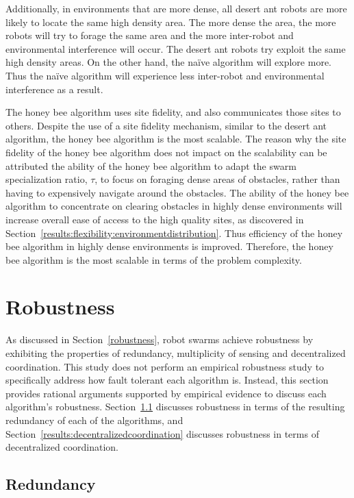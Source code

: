 Additionally, in environments that are more dense, all desert ant robots are more likely to locate the same high density area. The more dense the area, the more robots will try to forage the same area and the more inter-robot and environmental interference will occur. The desert ant robots try exploit the same high density areas. On the other hand, the na\"ive algorithm will explore more. Thus the na\"ive algorithm will experience less inter-robot and environmental interference as a result. 


The honey bee algorithm uses site fidelity, and also communicates those sites to others. Despite the use of a site fidelity mechanism, similar to the desert ant algorithm, the honey bee algorithm is the most scalable. The reason why the site fidelity of the honey bee algorithm does not impact on the scalability can be attributed the ability of the honey bee algorithm to adapt the swarm specialization ratio, $\tau$, to focus on foraging dense areas of obstacles, rather than having to expensively navigate around the obstacles. The ability of the honey bee algorithm to concentrate on clearing obstacles in highly dense environments will increase overall ease of access to the high quality sites, as discovered in Section~\ref{results:flexibility:environmentdistribution}. Thus efficiency of the honey bee algorithm in highly dense environments is improved. Therefore, the honey bee algorithm is the most scalable in terms of the problem complexity.



\section{Robustness}
\label{results:robustness}
As discussed in Section~\ref{robustness}, robot swarms achieve robustness by exhibiting the properties of redundancy, multiplicity of sensing and decentralized coordination. This study does not perform an empirical robustness study to specifically address how fault tolerant each algorithm is. Instead, this section provides rational arguments supported by empirical evidence to discuss each algorithm's robustness. Section~\ref{results:redundancy} discusses robustness in terms of the resulting redundancy of each of the algorithms, and Section~\ref{results:decentralizedcoordination} discusses robustness in terms of decentralized coordination.

\subsection{Redundancy}
\label{results:redundancy}

